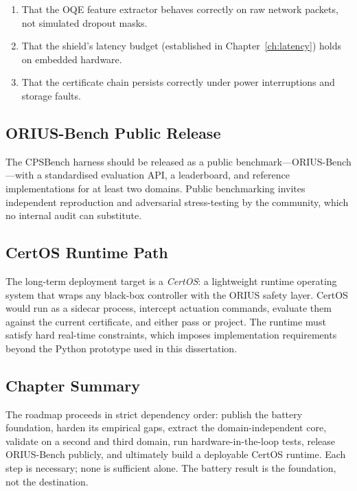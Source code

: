 \begin{enumerate}
  \item That the OQE feature extractor behaves correctly on raw network
    packets, not simulated dropout masks.
  \item That the shield's latency budget (established in
    Chapter~\ref{ch:latency}) holds on embedded hardware.
  \item That the certificate chain persists correctly under power
    interruptions and storage faults.
\end{enumerate}

\subsection{ORIUS-Bench Public Release}

The CPSBench harness should be released as a public benchmark---ORIUS-Bench
---with a standardised evaluation API, a leaderboard, and reference
implementations for at least two domains.  Public benchmarking invites
independent reproduction and adversarial stress-testing by the community,
which no internal audit can substitute.

\subsection{CertOS Runtime Path}

The long-term deployment target is a \emph{CertOS}: a lightweight runtime
operating system that wraps any black-box controller with the ORIUS
safety layer.  CertOS would run as a sidecar process, intercept actuation
commands, evaluate them against the current certificate, and either pass
or project.  The runtime must satisfy hard real-time constraints, which
imposes implementation requirements beyond the Python prototype used in
this dissertation.

\subsection{Chapter Summary}

The roadmap proceeds in strict dependency order: publish the battery
foundation, harden its empirical gaps, extract the domain-independent
core, validate on a second and third domain, run hardware-in-the-loop
tests, release ORIUS-Bench publicly, and ultimately build a deployable
CertOS runtime.  Each step is necessary; none is sufficient alone.  The
battery result is the foundation, not the destination.


